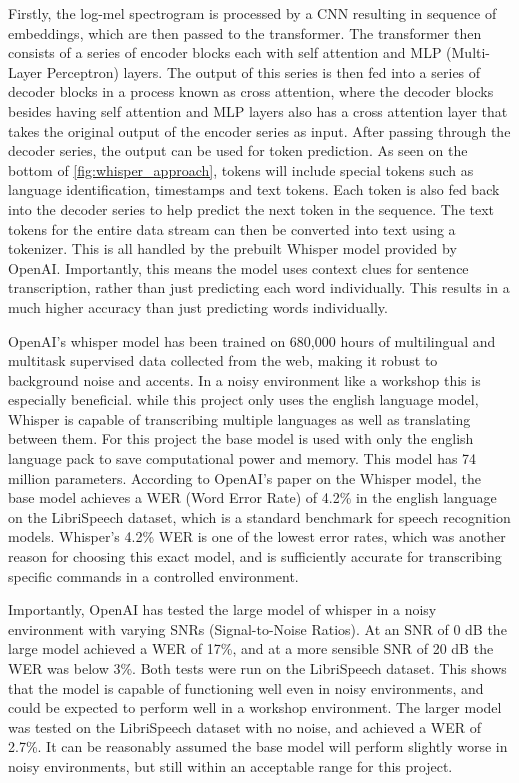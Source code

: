Firstly, the log-mel spectrogram is processed by a CNN resulting in sequence of embeddings, which are then passed to the transformer.\cite{huggingface_whisper} The transformer then consists of a series of encoder blocks each with self attention and MLP (Multi-Layer Perceptron) layers. The output of this series is then fed into a series of decoder blocks in a process known as cross attention, where the decoder blocks besides having self attention and MLP layers also has a cross attention layer that takes the original output of the encoder series as input. After passing through the decoder series, the output can be used for token prediction. As seen on the bottom of \cref{fig:whisper_approach}, tokens will include special tokens such as language identification, timestamps and text tokens. Each token is also fed back into the decoder series to help predict the next token in the sequence. The text tokens for the entire data stream can then be converted into text using a tokenizer. This is all handled by the prebuilt Whisper model provided by OpenAI.\cite{whisper_paper} Importantly, this means the model uses context clues for sentence transcription, rather than just predicting each word individually. This results in a much higher accuracy than just predicting words individually.

OpenAI's whisper model has been trained on 680,000 hours of multilingual and multitask supervised data collected from the web, making it robust to background noise and accents.\cite{whisper_paper} In a noisy environment like a workshop this is especially beneficial. while this project only uses the english language model, Whisper is capable of transcribing multiple languages as well as translating between them. For this project the base model is used with only the english language pack to save computational power and memory. This model has 74 million parameters. According to OpenAI's paper on the Whisper model, the base model achieves a WER (Word Error Rate) of 4.2\% in the english language on the LibriSpeech dataset,\cite{whisper_paper} which is a standard benchmark for speech recognition models. Whisper's 4.2\% WER is one of the lowest error rates, which was another reason for choosing this exact model, and is sufficiently accurate for transcribing specific commands in a controlled environment.

Importantly, OpenAI has tested the large model of whisper in a noisy environment with varying SNRs (Signal-to-Noise Ratios). At an SNR of 0 dB the large model achieved a WER of 17\%, and at a more sensible SNR of 20 dB the WER was below 3\%.\cite{whisper_paper} Both tests were run on the LibriSpeech dataset. This shows that the model is capable of functioning well even in noisy environments, and could be expected to perform well in a workshop environment. The larger model was tested on the LibriSpeech dataset with no noise, and achieved a WER of 2.7\%.\cite{whisper_paper} It can be reasonably assumed the base model will perform slightly worse in noisy environments, but still within an acceptable range for this project.
